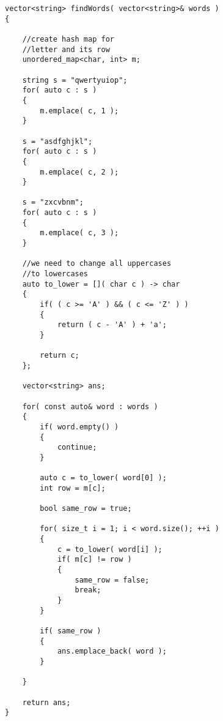 \setcounter{lstlisting}{0}
\begin{lstlisting}[style=customc, caption={Hash Map}]
vector<string> findWords( vector<string>& words )
{

    //create hash map for
    //letter and its row
    unordered_map<char, int> m;

    string s = "qwertyuiop";
    for( auto c : s )
    {
        m.emplace( c, 1 );
    }

    s = "asdfghjkl";
    for( auto c : s )
    {
        m.emplace( c, 2 );
    }

    s = "zxcvbnm";
    for( auto c : s )
    {
        m.emplace( c, 3 );
    }

    //we need to change all uppercases
    //to lowercases
    auto to_lower = []( char c ) -> char
    {
        if( ( c >= 'A' ) && ( c <= 'Z' ) )
        {
            return ( c - 'A' ) + 'a';
        }

        return c;
    };

    vector<string> ans;

    for( const auto& word : words )
    {
        if( word.empty() )
        {
            continue;
        }

        auto c = to_lower( word[0] );
        int row = m[c];

        bool same_row = true;

        for( size_t i = 1; i < word.size(); ++i )
        {
            c = to_lower( word[i] );
            if( m[c] != row )
            {
                same_row = false;
                break;
            }
        }

        if( same_row )
        {
            ans.emplace_back( word );
        }

    }

    return ans;
}
\end{lstlisting}